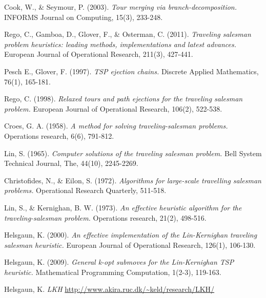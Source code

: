 \documentclass[titlepage, 12pt]{article}
\begin{document}
%
%
\begin{thebibliography}{9}
        Cook, W., \& Seymour, P. (2003).
        \emph{Tour merging via branch-decomposition.}
        INFORMS Journal on Computing, 15(3), 233-248.

        Rego, C., Gamboa, D., Glover, F., \& Osterman, C. (2011).
        \emph{Traveling salesman problem heuristics: leading methods, implementations and latest advances.}
        European Journal of Operational Research, 211(3), 427-441.

        Pesch E., Glover, F. (1997).
        \emph{TSP ejection chains.}
        Discrete Applied Mathematics, 76(1), 165-181.

        Rego, C. (1998).
        \emph{Relaxed tours and path ejections for the traveling salesman problem.}
        European Journal of Operational Research, 106(2), 522-538.

        Croes, G. A. (1958).
        \emph{A method for solving traveling-salesman problems.}
        Operations research, 6(6), 791-812.

        Lin, S. (1965).
        \emph{Computer solutions of the traveling salesman problem.}
        Bell System Technical Journal, The, 44(10), 2245-2269.

        Christofides, N., \& Eilon, S. (1972).
        \emph{Algorithms for large-scale travelling salesman problems.}
        Operational Research Quarterly, 511-518.

        Lin, S., \& Kernighan, B. W. (1973).
        \emph{An effective heuristic algorithm for the traveling-salesman problem.}
        Operations research, 21(2), 498-516.

        Helsgaun, K. (2000).
        \emph{An effective implementation of the Lin-Kernighan traveling salesman heuristic.}
        European Journal of Operational Research, 126(1), 106-130.

        Helsgaun, K. (2009).
        \emph{General k-opt submoves for the Lin-Kernighan TSP heuristic.}
        Mathematical Programming Computation, 1(2-3), 119-163.

        Helsgaun, K.
        \emph{LKH}
        \url{http://www.akira.ruc.dk/~keld/research/LKH/}


\end{thebibliography}
\end{document}
